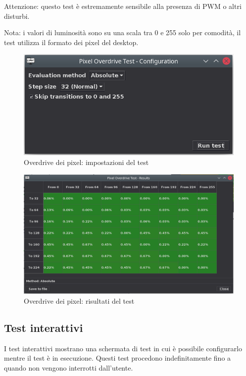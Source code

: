 Attenzione: questo test è estremamente sensibile alla presenza di PWM o altri disturbi.

Nota: i valori di luminosità sono su una scala tra 0 e 255 solo per comodità, il test utilizza il formato dei pixel del desktop.

\begin{figure}[H]
	\centering
	\includegraphics[width=.8\textwidth]{Applicazione_files/gui_pixeloverdrive_settings.png}
	\caption{Overdrive dei pixel: impostazioni del test}
	\label{fig:gui_pixeloverdrive_settings}
\end{figure}

\begin{figure}[H]
	\centering
	\includegraphics[width=\textwidth]{Applicazione_files/gui_pixeloverdrive_results.png}
	\caption{Overdrive dei pixel: risultati del test}
	\label{fig:gui_pixeloverdrive_results}
\end{figure}

\subsection{Test interattivi}
I test interattivi mostrano una schermata di test in cui è possibile configurarlo mentre il test è in esecuzione. Questi test procedono indefinitamente fino a quando non vengono interrotti dall'utente.

